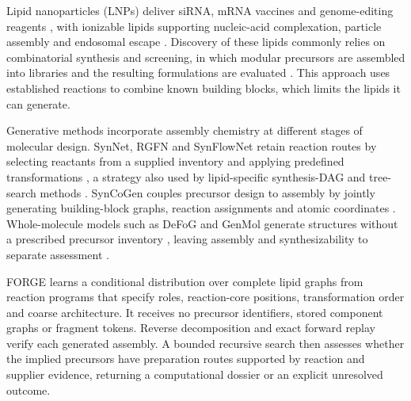 \documentclass{article}
\theoremstyle{definition}
\begin{document}
Lipid nanoparticles (LNPs) deliver siRNA, mRNA vaccines and genome-editing reagents
\citep{adams2018patisiran,polack2020safety,baden2021efficacy,gillmore2021crispr}, with ionizable
lipids supporting nucleic-acid complexation, particle assembly and endosomal escape
\citep{cullis2017lipid,hou2021lipid}. Discovery of these lipids commonly relies on combinatorial
synthesis and screening, in which modular precursors are assembled into libraries and the resulting
formulations are evaluated \citep{akinc2008combinatorial,love2010lipidlike,li2024accelerating,xu2024agile}.
This approach uses established reactions to combine known building blocks, which limits the lipids it can generate.

Generative methods incorporate assembly chemistry at different stages of molecular design.
SynNet, RGFN and SynFlowNet retain reaction routes by selecting reactants from a supplied inventory
and applying predefined transformations \citep{gao2022amortized,koziarski2024rgfn,cretu2025synflownet},
a strategy also used by lipid-specific synthesis-DAG and tree-search methods
\citep{ou2024deep,zhao2024generative}. SynCoGen couples precursor design to assembly by jointly
generating building-block graphs, reaction assignments and atomic coordinates
\citep{rekesh2025syncogen}. Whole-molecule models such as DeFoG and GenMol generate structures
without a prescribed precursor inventory \citep{qin2025defog,lee2025genmol}, leaving assembly and
synthesizability to separate assessment \citep{gao2020synthesizability}.

FORGE learns a conditional distribution over complete lipid graphs from reaction programs that
specify roles, reaction-core positions, transformation order and coarse architecture. It receives
no precursor identifiers, stored component graphs or fragment tokens. Reverse decomposition and
exact forward replay verify each generated assembly. A bounded recursive search then assesses
whether the implied precursors have preparation routes supported by reaction and supplier evidence,
returning a computational dossier or an explicit unresolved outcome.
\end{document}
